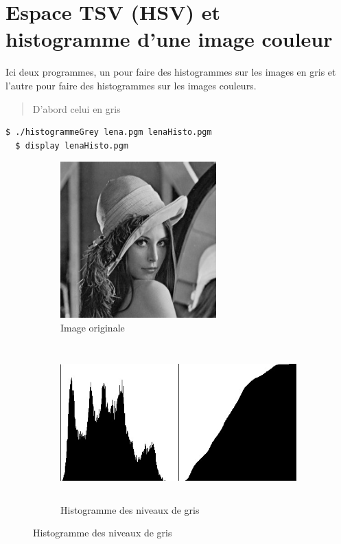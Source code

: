 \documentclass[a4paper,10pt]{article}
\begin{document}
    \section{Espace TSV (HSV) et histogramme d'une image couleur}
    Ici deux programmes, un pour faire des histogrammes sur les images en gris et l'autre pour faire des histogrammes sur les images couleurs.
    \begin{quote}
    D'abord celui en gris
    \end{quote}
    \begin{lstlisting}[language=Bash]
  $ ./histogrammeGrey lena.pgm lenaHisto.pgm     
  $ display lenaHisto.pgm
  \end{lstlisting}
  \begin{figure}[h]
   \begin{subfigure}{1\textwidth}
    \centering
    \includegraphics[width=0.6\linewidth, height=6cm]{lena}
    \caption{Image originale}
    \label{fig:lenaO}
    \end{subfigure}
     \begin{subfigure}{1\textwidth}
    \centering
    \includegraphics[width=1\linewidth, height=6cm]{lenaHisto}   
    \caption{Histogramme des niveaux de gris}
    \label{fig:lenaHisto}
    \end{subfigure}
    \end{figure}
    \pagebreak
    
\end{document}
